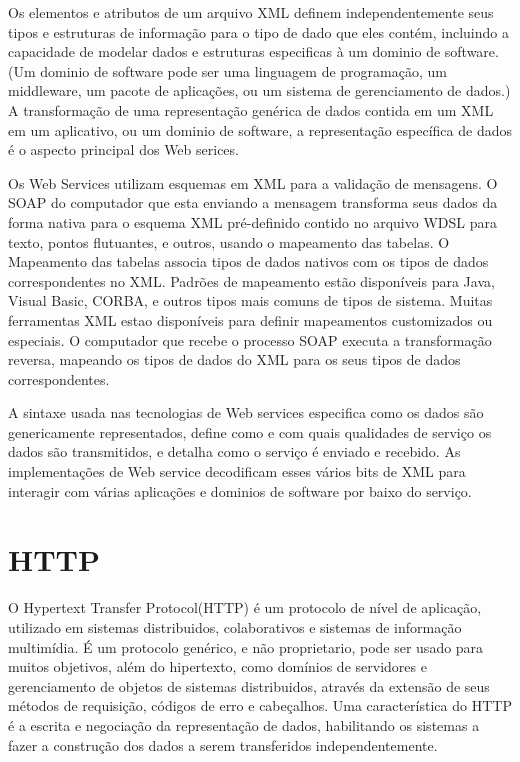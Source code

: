 \documentclass{acm_proc_article-sp}
\begin{document}
		Os elementos e atributos de um arquivo XML definem independentemente seus tipos e estruturas de informação para o tipo de dado que eles contém, incluindo a capacidade de modelar dados e estruturas especificas à um dominio de software. (Um dominio de software pode ser uma linguagem de programação, um middleware, um pacote de aplicações, ou um sistema de gerenciamento de dados.) A transformação de uma representação genérica de dados contida em um XML em um aplicativo, ou um dominio de software, a representação específica de dados é o aspecto principal dos Web serices.
		
		Os Web Services utilizam esquemas em XML para a validação de mensagens. O SOAP do computador que esta enviando a mensagem transforma seus dados da forma nativa para o esquema XML pré-definido contido no arquivo WDSL para texto, pontos flutuantes, e outros, usando o mapeamento das tabelas. O Mapeamento das tabelas associa tipos de dados nativos com os tipos de dados correspondentes no XML. Padrões de mapeamento estão disponíveis para Java, Visual Basic, CORBA, e outros tipos mais comuns de tipos de sistema. Muitas ferramentas XML estao disponíveis para definir mapeamentos customizados ou especiais. O computador que recebe o processo SOAP executa a transformação reversa, mapeando os tipos de dados do XML para os seus tipos de dados correspondentes.\cite{UNDERWEBSERVICES}
		
		A sintaxe usada nas tecnologias de Web services especifica como os dados são genericamente representados, define como e com quais qualidades de serviço os dados são transmitidos, e detalha como o serviço é enviado e recebido. As implementações de Web service decodificam esses vários bits de XML para interagir com várias aplicações e dominios de software por baixo do serviço.
		
\section{HTTP}
		O Hypertext Transfer Protocol(HTTP) é um protocolo de nível de aplicação, utilizado em sistemas distribuidos, colaborativos e sistemas de informação multimídia. É um protocolo genérico, e não proprietario, pode ser usado para muitos objetivos, além do hipertexto, como domínios de servidores e gerenciamento de objetos de sistemas distribuidos, através da extensão de seus métodos de requisição, códigos de erro e cabeçalhos. Uma característica do HTTP é a escrita e negociação da representação de dados, habilitando os sistemas a fazer a construção dos dados a serem transferidos independentemente.\cite{HTTP-1.1}
\end{document}
